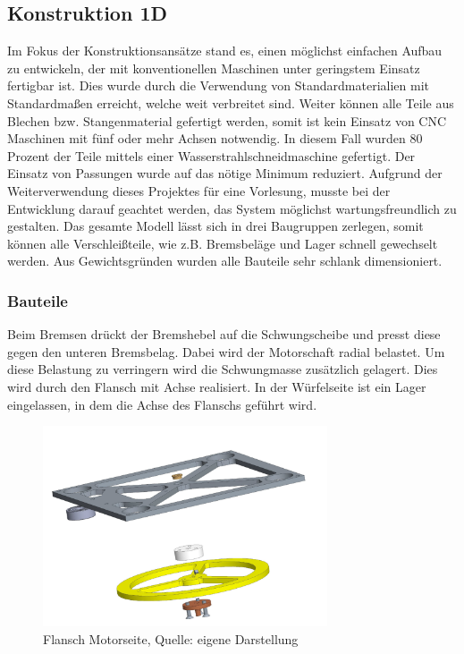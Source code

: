 \subsection{Konstruktion 1D}
Im Fokus der Konstruktionsansätze stand es, einen möglichst einfachen Aufbau zu entwickeln, der mit konventionellen Maschinen unter geringstem Einsatz fertigbar ist. Dies wurde durch die Verwendung von Standardmaterialien mit Standardmaßen erreicht, welche weit verbreitet sind. Weiter können alle Teile aus Blechen bzw. Stangenmaterial gefertigt werden, somit ist kein Einsatz von CNC Maschinen mit fünf oder mehr Achsen notwendig. In diesem Fall wurden 80 Prozent der Teile mittels einer Wasserstrahlschneidmaschine gefertigt. Der Einsatz von Passungen wurde auf das nötige Minimum reduziert. Aufgrund der Weiterverwendung dieses Projektes für eine Vorlesung, musste bei der Entwicklung darauf geachtet werden, das System möglichst wartungsfreundlich zu gestalten. Das gesamte Modell lässt sich in drei Baugruppen zerlegen, somit können alle Verschleißteile, wie z.B. Bremsbeläge und Lager schnell gewechselt werden. Aus Gewichtsgründen wurden alle Bauteile sehr schlank dimensioniert. 


\subsubsection{Bauteile}

Beim Bremsen drückt der Bremshebel auf die Schwungscheibe und presst diese gegen den unteren Bremsbelag. Dabei wird der Motorschaft radial belastet. Um diese Belastung zu verringern wird die Schwungmasse zusätzlich gelagert. Dies wird durch den Flansch mit Achse realisiert. In der Würfelseite ist ein Lager eingelassen, in dem die Achse des Flanschs geführt wird. 

	\begin{figure}[!h]
	\begin{center}
	\includegraphics[width=0.75\textwidth]{img/Explosionszeichnung_Schwungscheibe.png}
	\end{center}
	\caption{Flansch Motorseite, Quelle: eigene Darstellung}
	\end{figure} 
 


